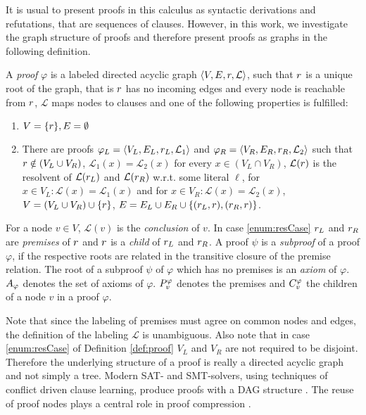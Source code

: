 It is usual to present proofs in this calculus as syntactic derivations and refutations, that are sequences of clauses.
However, in this work, we investigate the graph structure of proofs and therefore present proofs as graphs in the following definition.

\begin{definition}[Proof] 
\label{def:proof}
A \emph{proof} $\varphi$ is a labeled directed acyclic graph $\langle V,E,r,\mathcal{L} \rangle$, such that
$r$ is a unique root of the graph, that is $r$ has no incoming edges and every node is reachable from $r$, $\mathcal{L}$ maps nodes to clauses and one of the following properties is fulfilled:

\begin{enumerate}
	\item $V = \{r\}, E = \emptyset$
	\item \label{enum:resCase} 
		There are proofs $\varphi_L = \langle V_L, E_L, r_L,\mathcal{L}_1 \rangle$ and $\varphi_R = \langle V_R, E_R, r_R, \mathcal{L}_2 \rangle$ such that 
		$r \notin (V_L \cup V_R)$, $\mathcal{L}_1(x) = \mathcal{L}_2(x)$ for every $x \in (V_L \cap V_R)$,
		$\mathcal{L}(r)$ is the resolvent of $\mathcal{L}(r_L)$ and $\mathcal{L}(r_R)$ w.r.t. some literal $\ell$,
		for $x \in V_L: \mathcal{L}(x) = \mathcal{L}_1(x)$ and for $x \in V_R: \mathcal{L}(x) = \mathcal{L}_2(x)$,
		$V = (V_L \cup V_R) \cup \{r \}$, $E = E_L \cup E_R \cup \{(r_L,r) , (r_R,r) \}$.
\end{enumerate}

For a node $v \in V$, $\mathcal{L}(v)$ is the \emph{conclusion} of $v$.
In case \ref{enum:resCase} $r_L$ and $r_R$ are \emph{premises} of $r$ and $r$ is a \emph{child} of $r_L$ and $r_R$.
A proof $\psi$ is a \emph{subproof} of a proof $\varphi$, if the respective roots are related in the transitive closure of the premise relation.
The root of a subproof $\psi$ of $\varphi$ which has no premises is an \emph{axiom} of $\varphi$.
$A_{\varphi}$ denotes the set of axioms of $\varphi$. 
$P_{v}^{\varphi}$ denotes the premises and $C_{v}^{\varphi}$ the children of a node $v$ in a proof $\varphi$.

\end{definition}

Note that since the labeling of premises must agree on common nodes and edges, the definition of the labeling $\mathcal{L}$ is unambiguous.
Also note that in case \ref{enum:resCase} of Definition \ref{def:proof} $V_L$ and $V_R$ are not required to be disjoint. 
Therefore the underlying structure of a proof is really a directed acyclic graph and not simply a tree. 
Modern SAT- and SMT-solvers, using techniques of conflict driven clause learning, produce proofs with a  DAG structure \cite{Bouton2009,Biere2009}.
The reuse of proof nodes plays a central role in proof compression \cite{Fontaine2011}.

